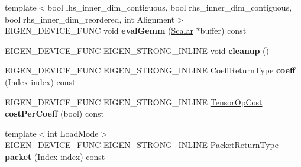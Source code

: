 \begin{DoxyCompactItemize}
\item 
\mbox{\label{struct_eigen_1_1_tensor_contraction_evaluator_base_aee0cb093c9876554ac9fecd6a96d4d87}} 
{\footnotesize template$<$bool lhs\+\_\+inner\+\_\+dim\+\_\+contiguous, bool rhs\+\_\+inner\+\_\+dim\+\_\+contiguous, bool rhs\+\_\+inner\+\_\+dim\+\_\+reordered, int Alignment$>$ }\\E\+I\+G\+E\+N\+\_\+\+D\+E\+V\+I\+C\+E\+\_\+\+F\+U\+NC void {\bfseries eval\+Gemm} (\hyperlink{group___sparse_core___module}{Scalar} $\ast$buffer) const
\item 
\mbox{\label{struct_eigen_1_1_tensor_contraction_evaluator_base_a56030af621dbf3097cef597ecb2b180a}} 
E\+I\+G\+E\+N\+\_\+\+D\+E\+V\+I\+C\+E\+\_\+\+F\+U\+NC E\+I\+G\+E\+N\+\_\+\+S\+T\+R\+O\+N\+G\+\_\+\+I\+N\+L\+I\+NE void {\bfseries cleanup} ()
\item 
\mbox{\label{struct_eigen_1_1_tensor_contraction_evaluator_base_af35dc8f04e25238ed04628398d1adc53}} 
E\+I\+G\+E\+N\+\_\+\+D\+E\+V\+I\+C\+E\+\_\+\+F\+U\+NC E\+I\+G\+E\+N\+\_\+\+S\+T\+R\+O\+N\+G\+\_\+\+I\+N\+L\+I\+NE Coeff\+Return\+Type {\bfseries coeff} (Index index) const
\item 
\mbox{\label{struct_eigen_1_1_tensor_contraction_evaluator_base_ad0f21541238d3add97d114afb6859b0f}} 
E\+I\+G\+E\+N\+\_\+\+D\+E\+V\+I\+C\+E\+\_\+\+F\+U\+NC E\+I\+G\+E\+N\+\_\+\+S\+T\+R\+O\+N\+G\+\_\+\+I\+N\+L\+I\+NE \hyperlink{class_eigen_1_1_tensor_op_cost}{Tensor\+Op\+Cost} {\bfseries cost\+Per\+Coeff} (bool) const
\item 
\mbox{\label{struct_eigen_1_1_tensor_contraction_evaluator_base_a430b83d71a67ba792130b8d36c049a9f}} 
{\footnotesize template$<$int Load\+Mode$>$ }\\E\+I\+G\+E\+N\+\_\+\+D\+E\+V\+I\+C\+E\+\_\+\+F\+U\+NC E\+I\+G\+E\+N\+\_\+\+S\+T\+R\+O\+N\+G\+\_\+\+I\+N\+L\+I\+NE \hyperlink{group___sparse_core___module}{Packet\+Return\+Type} {\bfseries packet} (Index index) const
\item 
\mbox{\label{struct_eigen_1_1_tensor_contraction_evaluator_base_a6babd619ca988fb16d5859c516308730}} 

\end{DoxyCompactItemize}

